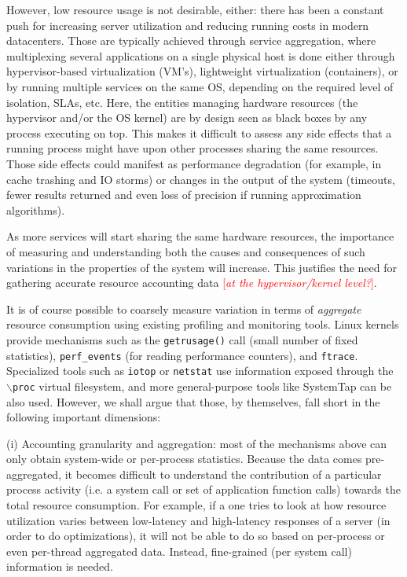 \documentclass[letterpaper,twocolumn,10pt]{article}
\newcommand{\lnote}[1]{\textcolor{red}{[\textit{#1}]}} %
\begin{document}
However, low resource usage is not desirable, either: there has been a constant push for increasing server utilization and reducing running costs in modern datacenters. Those are typically achieved through service aggregation, where multiplexing several applications on a single physical host is done either through hypervisor-based virtualization (VM's), lightweight virtualization (containers), or by running multiple services on the same OS, depending on the required level of isolation, SLAs, etc. 
Here, the entities managing hardware resources (the hypervisor and/or the OS kernel) are by design seen as black boxes by any process executing on top. This makes it difficult to assess any side effects that a running process might have upon other processes sharing the same resources. Those side effects could manifest as performance degradation (for example, in cache trashing and IO storms) or changes in the output of the system (timeouts, fewer results returned and even loss of precision if running approximation algorithms).

As more services will start sharing the same hardware resources, the importance of measuring and understanding both the causes and consequences of such variations in the properties of the system will increase. This justifies the need for gathering accurate resource accounting data \lnote{at the hypervisor/kernel level?}.

It is of course possible to coarsely measure variation in terms of \textit{aggregate} resource consumption using existing profiling and monitoring tools. Linux kernels provide mechanisms such as the \texttt{getrusage()} call (small number of fixed statistics), \texttt{perf\_events} (for reading performance counters), and \texttt{ftrace}. Specialized tools such as \texttt{iotop} or \texttt{netstat} use information exposed through the \texttt{$\backslash$proc} virtual filesystem, and more general-purpose tools like SystemTap can be also used. However, we shall argue that those, by themselves, fall short in the following important dimensions: 

(i) Accounting granularity and aggregation: most of the mechanisms above can only obtain system-wide or per-process statistics. Because the data comes pre-aggregated, it becomes difficult to understand the contribution of a particular process activity (i.e. a system call or set of application function calls) towards the total resource consumption. For example, if a one tries to look at how resource utilization varies between low-latency and high-latency responses of a server (in order to do optimizations), it will not be able to do so based on per-process or even per-thread aggregated data. Instead, fine-grained (per system call) information is needed.
\end{document}
